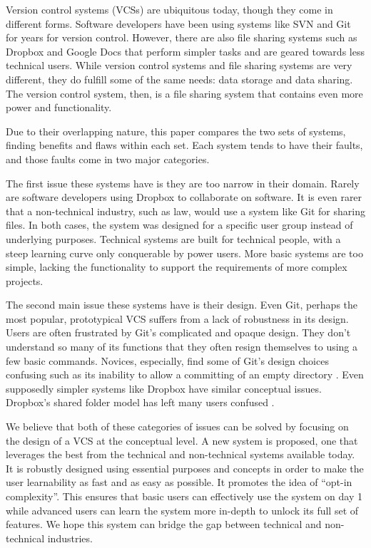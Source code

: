 Version control systems (VCSs) are ubiquitous today, though they come in different forms. Software developers have been using systems like SVN and Git for years for version control. However, there are also file sharing systems such as Dropbox and Google Docs that perform simpler tasks and are geared towards less technical users. While version control systems and file sharing systems are very different, they do fulfill some of the same needs: data storage and data sharing. The version control system, then, is a file sharing system that contains even more power and functionality.

Due to their overlapping nature, this paper compares the two sets of systems, finding benefits and flaws within each set. Each system tends to have their faults, and those faults come in two major categories.

The first issue these systems have is they are too narrow in their domain. Rarely are software developers using Dropbox to collaborate on software. It is even rarer that a non-technical industry, such as law, would use a system like Git for sharing files. In both cases, the system was designed for a specific user group instead of underlying purposes. Technical systems are built for technical people, with a steep learning curve only conquerable by power users. More basic systems are too simple, lacking the functionality to support the requirements of more complex projects.

The second main issue these systems have is their design. Even Git, perhaps the most popular, prototypical VCS suffers from a lack of robustness in its design. Users are often frustrated by Git's complicated and opaque design. They don’t understand so many of its functions that they often resign themselves to using a few basic commands. Novices, especially, find some of Git's design choices confusing such as its inability to allow a committing of an empty directory \cite{RossoJackson}. Even supposedly simpler systems like Dropbox have similar conceptual issues. Dropbox's shared folder model has left many users confused \cite{Zhang}. 

We believe that both of these categories of issues can be solved by focusing on the design of a VCS at the conceptual level. A new system is proposed, one that leverages the best from the technical and non-technical systems available today. It is robustly designed using essential purposes and concepts in order to make the user learnability as fast and as easy as possible. It promotes the idea of ``opt-in complexity''. This ensures that basic users can effectively use the system on day 1 while advanced users can learn the system more in-depth to unlock its full set of features. We hope this system can bridge the gap between technical and non-technical industries. 

